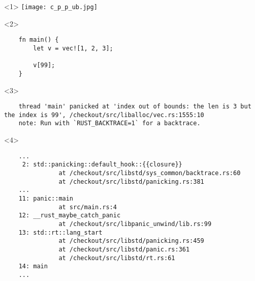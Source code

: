 \begin{frame}[fragile]{\insertsubsubsection}
  \begin{onlyenv}<1>
    \texttt{[image: c\_p\_p\_ub.jpg]}%
  \end{onlyenv} 

  \begin{onlyenv}<2>

  \begin{verbatim}
    fn main() {
        let v = vec![1, 2, 3];
    
        v[99];
    }
  \end{verbatim}
    
  \end{onlyenv}

  \begin{onlyenv}<3>

  \begin{verbatim}
    thread 'main' panicked at 'index out of bounds: the len is 3 but the index is 99', /checkout/src/liballoc/vec.rs:1555:10
    note: Run with `RUST_BACKTRACE=1` for a backtrace.
  \end{verbatim}
    
  \end{onlyenv} 

  \begin{onlyenv}<4>

  \begin{verbatim}
    ...
     2: std::panicking::default_hook::{{closure}}
               at /checkout/src/libstd/sys_common/backtrace.rs:60
               at /checkout/src/libstd/panicking.rs:381
    ...
    11: panic::main
               at src/main.rs:4
    12: __rust_maybe_catch_panic
               at /checkout/src/libpanic_unwind/lib.rs:99
    13: std::rt::lang_start
               at /checkout/src/libstd/panicking.rs:459
               at /checkout/src/libstd/panic.rs:361
               at /checkout/src/libstd/rt.rs:61
    14: main
    ...
  \end{verbatim}
    
  \end{onlyenv} 

\end{frame}
